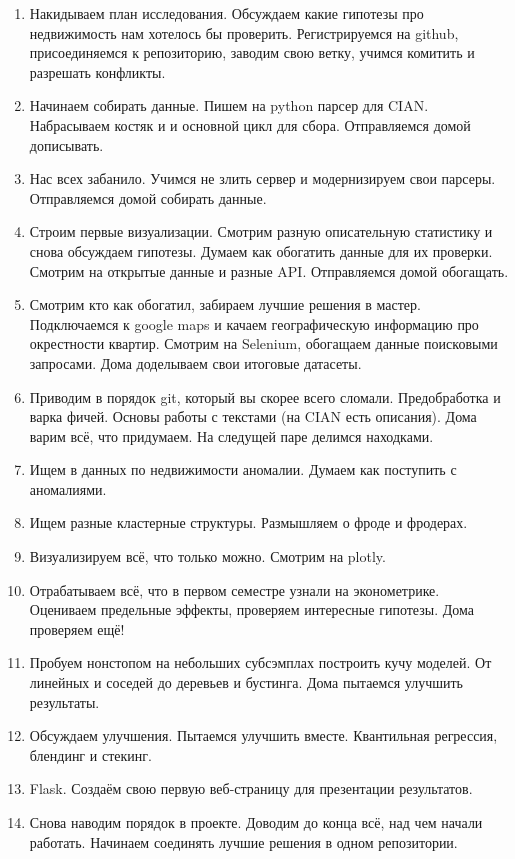 \documentclass[12pt, a4paper, oneside]{article}
\begin{document}
\begin{enumerate}
	\item  Накидываем план исследования. Обсуждаем какие гипотезы про недвижимость нам хотелось бы проверить. Регистрируемся на github, присоединяемся к репозиторию, заводим свою ветку, учимся комитить и разрешать конфликты. 
		
	\item Начинаем собирать данные. Пишем на python парсер для CIAN. Набрасываем костяк и и основной цикл для сбора. Отправляемся домой дописывать. 
	
	\item Нас всех забанило. Учимся не злить сервер и модернизируем свои парсеры. Отправляемся домой собирать данные. 
	
	\item Строим первые визуализации. Смотрим разную описательную статистику и снова обсуждаем гипотезы. Думаем как обогатить данные для их проверки. Смотрим на открытые данные и разные API.  Отправляемся домой обогащать.
	
	\item Смотрим кто как обогатил, забираем лучшие решения в мастер. Подключаемся к google maps и качаем географическую информацию про окрестности квартир. Смотрим на Selenium, обогащаем данные поисковыми запросами. Дома доделываем свои итоговые датасеты. 
	
	\item Приводим в порядок git, который вы скорее всего сломали.  Предобработка и варка фичей. Основы работы с текстами (на CIAN есть описания). Дома варим всё, что придумаем. На следущей паре делимся находками. 
	
	\item Ищем в данных по недвижимости аномалии. Думаем как поступить с аномалиями.  
	
	\item Ищем разные кластерные структуры. Размышляем о фроде и фродерах. 
	
	\item Визуализируем всё, что только можно. Смотрим на plotly. 
	
	\item Отрабатываем всё, что в первом семестре узнали на эконометрике. Оцениваем предельные эффекты, проверяем интересные гипотезы.  Дома проверяем ещё!
	
	\item Пробуем нонстопом на небольших субсэмплах построить кучу моделей. От линейных и соседей до деревьев и бустинга. Дома пытаемся улучшить результаты. 
	
	\item  Обсуждаем улучшения. Пытаемся улучшить вместе. Квантильная регрессия, блендинг и стекинг. 
	
	\item Flask. Создаём свою первую веб-страницу для презентации результатов.
	
	\item Снова наводим порядок в проекте. Доводим до конца всё, над чем начали работать. Начинаем соединять лучшие решения в одном репозитории.
\end{enumerate}
\end{document}
